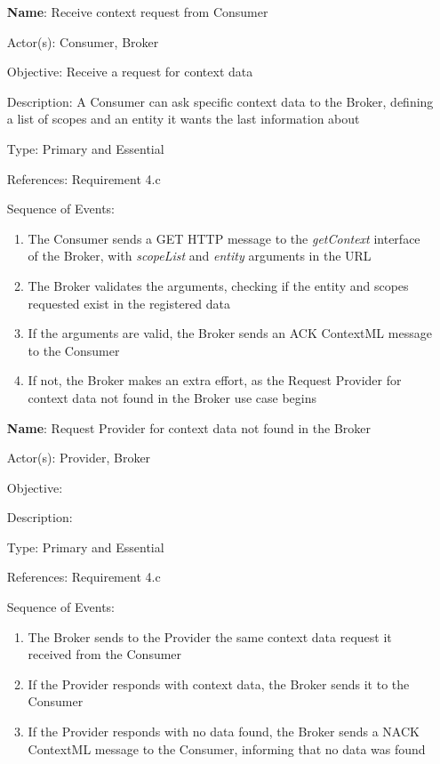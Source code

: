\begin{itemize}
	\item[\textbf{Name}:] Receive context request from Consumer
	\item[Actor(s):] Consumer, Broker
	\item[Objective:] Receive a request for context data
	\item[Description:] A Consumer can ask specific context data to the Broker, defining a list of scopes and an entity it wants the last information about
	\item[Type:] Primary and Essential
	\item[References:] Requirement 4.c
	\item[Sequence of Events:]\hfill
	\begin{enumerate}
		\item The Consumer sends a GET HTTP message to the \textit{getContext} interface of the Broker, with \textit{scopeList} and \textit{entity} arguments in the URL
		\item The Broker validates the arguments, checking if the entity and scopes requested exist in the registered data
		\item If the arguments are valid, the Broker sends an ACK ContextML message to the Consumer
		\item If not, the Broker makes an extra effort, as the Request Provider for context data not found in the Broker use case begins
	\end{enumerate}
\end{itemize}

\begin{itemize}
	\item[\textbf{Name}:] Request Provider for context data not found in the Broker
	\item[Actor(s):] Provider, Broker
	\item[Objective:]
	\item[Description:]
	\item[Type:] Primary and Essential
	\item[References:] Requirement 4.c
	\item[Sequence of Events:]\hfill
	\begin{enumerate}
		\item The Broker sends to the Provider the same context data request it received from the Consumer
		\item If the Provider responds with context data, the Broker sends it to the Consumer
		\item If the Provider responds with no data found, the Broker sends a NACK ContextML message to the Consumer, informing that no data was found
	\end{enumerate}
\end{itemize}

